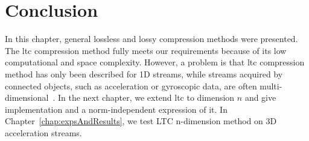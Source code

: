 \section{Conclusion}


In this chapter, general lossless and lossy compression methods were
presented. The \acrshort{ltc} compression method fully meets our
requirements because of its low computational and space complexity.
However, a problem is that \acrshort{ltc} compression method has only been
described for 1D streams, while streams acquired by connected objects, such
as acceleration or gyroscopic data, are often
multi-dimensional~\cite{li2018multi}. In the next chapter, we extend
\acrshort{ltc} to dimension $n$ and give implementation and a
norm-independent expression of it. In Chapter~\ref{chap:expsAndResults}, we
test LTC n-dimension method on 3D acceleration streams. 
